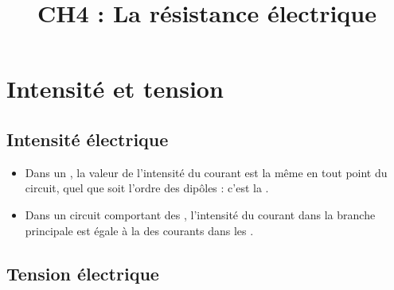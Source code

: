 \documentclass[xcolor={dvipsnames}]{beamer}
\title{CH4 : La résistance électrique}
\begin{document}
\begin{frame}
  \titlepage 
\end{frame}

\section{Intensité et tension}


\subsection{Intensité électrique}


%
%			
%			
%			



\begin{frame}

\begin{mybilan}
	\begin{itemize}
		\item Dans un , la valeur de l'intensité du courant est la même en tout point du circuit, quel que soit l'ordre des dipôles : c'est la .\pause
		
		
		\item Dans un circuit comportant des , l'intensité du courant dans la branche principale est égale à la  des courants dans les .		
		
	\end{itemize}
\end{mybilan}

\end{frame}


\subsection{Tension électrique}
\end{document}
